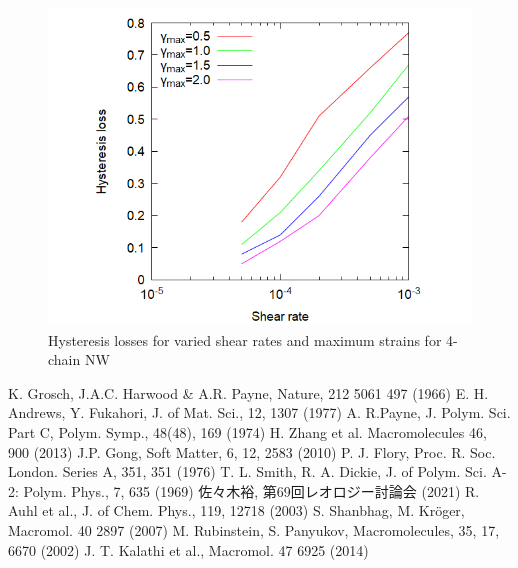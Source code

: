 \documentclass[uplatex,dvipdfmx,a4paper,10pt]{jsarticle}
\begin{document}
\begin{figure}[hb]
\begin{minipage}{0.33\hsize}
\begin{center}
	\end{center}
\end{minipage}
\begin{minipage}{0.33\hsize}
	\begin{center}
        \includegraphics[width=.9\textwidth]{hyst_shear.png}
        \caption{Hysteresis losses for varied shear rates and maximum strains for 4-chain NW}
        \label{fig:hystloss}
	\end{center}
\end{minipage}
\end{figure}

\vspace{-7mm}
\begin{thebibliography}{99}
     K. Grosch, J.A.C. Harwood \& A.R. Payne, Nature, 212 5061 497 (1966)
     E. H. Andrews, Y. Fukahori, J. of Mat. Sci., 12, 1307 (1977)
     A. R.Payne, J. Polym. Sci. Part C, Polym. Symp., 48(48), 169 (1974)
     H. Zhang et al. Macromolecules 46, 900 (2013)
     J.P. Gong, Soft Matter, 6, 12, 2583 (2010)
     P. J. Flory, Proc. R. Soc. London. Series A, 351, 351 (1976)
     T. L. Smith, R. A. Dickie, J. of Polym. Sci. A-2: Polym. Phys., 7, 635 (1969)
     佐々木裕, 第69回レオロジー討論会 (2021)
     R. Auhl et al., J. of Chem. Phys., 119, 12718 (2003)
     S. Shanbhag, M. Kr\"{o}ger, Macromol. 40 2897 (2007)
     M. Rubinstein, S. Panyukov, Macromolecules, 35, 17, 6670 (2002)
     J. T. Kalathi et al., Macromol. 47 6925 (2014)
\end{thebibliography}
\end{document}
